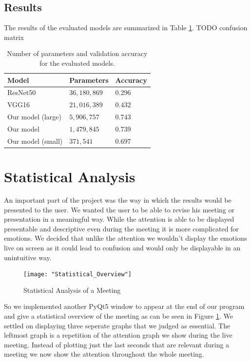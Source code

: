\documentclass{article}
\begin{document}
\subsection{Results}
The results of the evaluated models are summarized in Table \ref{tab:results}. TODO confusion matrix
\begin{table}
  \centering
  \begin{tabular}{ |p{3cm}||p{2cm}|p{2cm}| }
    \hline
    Model & Parameters & Accuracy\\
    \hline
    ResNet50 & $36,180,869$ & $0.296$\\
    \hline
    VGG16 & $21,016,389$ & $0.432$\\
    \hline
    Our model (large) & $5,906,757$ & $0.743$\\
    \hline
    Our model & $1,479,845$ & $0.739$\\
    \hline
    Our model (small) & $371,541$ & $0.697$\\
    \hline
  \end{tabular}
  \caption{Number of parameters and validation accuracy for the evaluated models.}
  \label{tab:results}
\end{table}

\section{Statistical Analysis}
An important part of the project was the way in which the results would be presented to the user. We wanted the user to be able to revise his meeting or presentation in a meaningful way. While the attention is able to be displayed presentable and descriptive even during the meeting it is more complicated for emotions. We decided that unlike the attention we wouldn't display the emotions live on screen as it could lead to confusion and would only be displayable in an unintuitive way.
 
\begin{figure}
 	\centering
 	\texttt{[image: "Statistical\_Overview"]} 
 	\caption{Statistical Analysis of a Meeting}
 	\label{fig:statisticalOverview}
\end{figure}

So we implemented another PyQt5 window to appear at the end of our program and give a statistical overview of the meeting as can be seen in Figure \ref{fig:statisticalOverview}. We settled on displaying three seperate graphs that we judged as essential. The leftmost graph is a repetition of the attention graph we show during the live meeting. Instead of plotting just the last seconds that are relevant during a meeting we now show the attention throughout the whole meeting. 
\end{document}
